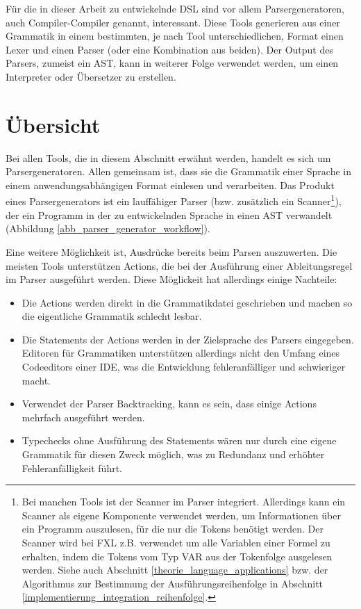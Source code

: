 Für die in dieser Arbeit zu entwickelnde DSL sind vor allem Parsergeneratoren, auch Compiler-Compiler genannt, interessant. Diese Tools generieren aus einer Grammatik in einem bestimmten, je nach Tool unterschiedlichen, Format einen Lexer und einen Parser (oder eine Kombination aus beiden). Der Output des Parsers, zumeist ein AST, kann in weiterer Folge verwendet werden, um einen Interpreter oder Übersetzer zu erstellen.


\section{Über\-sicht}

Bei allen Tools, die in diesem Abschnitt erwähnt werden, handelt es sich um Parsergeneratoren. Allen gemeinsam ist, dass sie die Grammatik einer Sprache in einem anwendungsabhängigen Format einlesen und verarbeiten. Das Produkt eines Parsergenerators ist ein lauffähiger  Parser (bzw. zusätzlich ein Scanner\footnote{Bei manchen Tools ist der Scanner im Parser integriert. Allerdings kann ein Scanner als eigene Komponente verwendet werden, um Informationen über ein Programm auszulesen, für die nur die Tokens benötigt werden. Der Scanner wird bei FXL z.B. verwendet um alle Variablen einer Formel zu erhalten, indem die Tokens vom Typ VAR aus der Tokenfolge ausgelesen werden. Siehe auch Abschnitt \ref{theorie_language_applications} bzw. der Algorithmus zur Bestimmung der Ausführungsreihenfolge in Abschnitt \ref{implementierung_integration_reihenfolge}.}), der ein Programm in der zu entwickelnden Sprache in einen AST verwandelt (Abbildung \ref{abb_parser_generator_workflow}). 

Eine weitere Möglichkeit ist, Ausdrücke bereits beim Parsen auszuwerten. Die meisten Tools unterstützen Actions, die bei der Ausführung einer Ab\-lei\-tungs\-re\-gel im Parser ausgeführt werden. Diese Möglickeit hat allerdings einige Nachteile:

\begin{itemize}
  \item Die Actions werden direkt in die Grammatikdatei geschrieben und machen so die eigentliche Grammatik schlecht lesbar.
  \item Die Statements der Actions werden in der Zielsprache des Parsers eingegeben. Editoren für Grammatiken unterstützen allerdings nicht den Umfang eines Codeeditors einer IDE, was die Entwicklung fehleranfälliger und schwieriger macht.
  \item Verwendet der Parser Backtracking, kann es sein, dass einige Actions mehrfach ausgeführt werden.
  \item Typechecks ohne Ausführung des Statements wären nur durch eine eigene Grammatik für diesen Zweck möglich, was zu Redundanz und erhöhter Fehleranfälligkeit führt.
\end{itemize}


